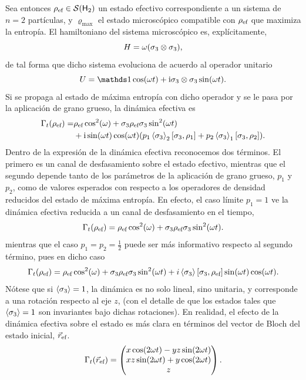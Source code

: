 Sea entonces $\rho_{\text{ef}}\in\mathcal{S}({\sf H}_{2})$ un estado efectivo correspondiente a un sistema de $n=2$ partículas, y $\varrho_{\max}$ el estado microscópico compatible con $\rho_{\text{ef}}$ que maximiza la entropía. El hamiltoniano del sistema microscópico es, explícitamente,
\begin{equation}
    H=\omega\qty(\sigma_{3}\otimes\sigma_{3}),\nonumber
\end{equation}
de tal forma que dicho sistema evoluciona de acuerdo al operador unitario
\begin{equation}
    U=\Id \cos(\omega t)+ \rmi \pauli{3}\otimes\pauli{3} \sin(\omega t).\nonumber
\end{equation}
Si se propaga al estado de máxima entropía con dicho operador y se le pasa por la aplicación de grano grueso, la dinámica efectiva es
\begin{align}
    \Gamma_{t}(\rho_{\text{ef}})=&\rho_{\text{ef}} \cos^{2}(\omega)+\sigma_{3} \rho_{\text{ef}} \sigma_{3} \sin^{2}(\omega t)\nonumber\\
    & + \text{i} \sin(\omega t)\cos(\omega t)\qty(p_{1}\expval{\sigma_{3}}_{2}[\sigma_{3},\rho_{1}]+p_{2}\expval{\sigma_{3}}_{1}[\sigma_{3},\rho_{2}]).\nonumber
\end{align}
Dentro de la expresión de la dinámica efectiva reconocemos dos términos. El primero es un canal de desfasamiento sobre el estado efectivo, mientras que el segundo depende tanto de los parámetros de la aplicación de grano grueso, $p_{1}$ y $p_{2}$, como de valores esperados con respecto a los operadores de densidad reducidos del estado de máxima entropía. En efecto, el caso límite $p_{1}=1$ ve la dinámica efectiva reducida a un canal de desfasamiento en el tiempo,
\begin{equation}\label{eq:EffectiveIsing2}
    \Gamma_{t}(\rho_{\text{ef}})=\rho_{\text{ef}} \cos^{2}(\omega)+\sigma_{3} \rho_{\text{ef}} \sigma_{3} \sin^{2}(\omega t).\nonumber
\end{equation}
mientras que el caso $p_{1}=p_{2}=\frac{1}{2}$ puede ser más informativo respecto al segundo término, pues en dicho caso
\begin{equation}
    \Gamma_{t}(\rho_{\text{ef}})=\rho_{\text{ef}} \cos^{2}(\omega)+\sigma_{3} \rho_{\text{ef}} \sigma_{3} \sin^{2}(\omega t) + i\expval{\sigma_{3}} \qty[\sigma_{3},\rho_{\text{ef}}] \sin(\omega t)\cos(\omega t).\nonumber
\end{equation}
Nótese que si $\expval{\sigma_{3}}=1$, la dinámica es no solo lineal, sino unitaria, y corresponde a una rotación respecto al eje $z$, (con el detalle de que los estados tales que $\expval{\sigma_{3}}=1$ son invariantes bajo dichas rotaciones). En realidad, el efecto de la dinámica efectiva sobre el estado es más clara en términos del vector de Bloch del estado inicial, $\vec{r}_{\text{ef}}$.
\begin{equation}\label{eq:EffectiveIsing2BV}
    \Gamma_{t}(\vec{r}_{\text{ef}})=\begin{pmatrix}
        x\cos(2\omega t)-yz\sin(2\omega t)\\
        xz\sin(2\omega t)+y\cos(2\omega t)\\
        z\\
    \end{pmatrix}.
\end{equation}

